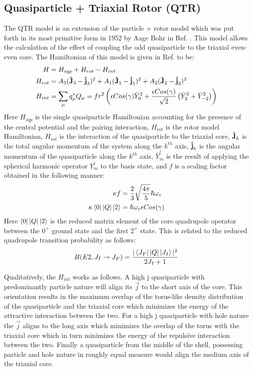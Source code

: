 \subsection{Quasiparticle + Triaxial Rotor (QTR)}
\label{sec:models-qtr}
The QTR model is an extension of the particle + rotor model which was put forth in its most primitive form in 1952 by Aage Bohr in Ref. \cite{bohrParticlePlusRotor}. This model allows the calculation of the effect of coupling the odd quasiparticle to the triaxial even-even core. The Hamiltonian of this model is given in Ref. \cite{frauendorfTransverseWobbling} to be:
\begin{align}
\label{eqn:chp2-qtr-hamil}
H&=H_{sqp}+H_{rot}-H_{int}\\
H_{rot}&=A_3(\boldsymbol{\hat{\textbf{J}}}_3-\boldsymbol{\hat{\textbf{j}}}_3)^2+A_1(\boldsymbol{\hat{\textbf{J}}}_1-\boldsymbol{\hat{\textbf{j}}}_1)^2+A_2(\boldsymbol{\hat{\textbf{J}}}_2-\boldsymbol{\hat{\textbf{j}}}_2)^2\\
H_{int}&= \sum\limits_{\mu}^{}q^*_{\mu}Q_{\mu} = f r^2 \left(\epsilon Cos(\gamma) \bar{Y}^2_0 + \frac{\epsilon Cos(\gamma)}{\sqrt{2}}\left(\bar{Y}^2_2 + \bar{Y}^2_{-2}\right)\right)
\end{align}
Here $H_{sqp}$ is the single quasiparticle Hamiltonian accounting for the presence of the central potential and the pairing interaction, $H_{rot}$ is the rotor model Hamiltonian, $H_{int}$ is the interaction of the quasiparticle to the triaxial core, $\boldsymbol{\hat{\textbf{J}}}_k$ is the total angular momentum of the system along the $k^{th}$ axis, $\boldsymbol{\hat{\textbf{j}}}_k$ is the angular momentum of the quasiparticle along the $k^{th}$ axis, $\bar{Y}^l_m$ is the result of applying the spherical harmonic operator $Y^l_m$ to the basis state, and $f$ is a scaling factor obtained in the following manner:
\begin{align}
\label{eqn:chp2-qtr-int-hamil-scaling}
\kappa f &= \frac{2}{3}\sqrt{\frac{4\pi}{5}}\hbar\omega_{\circ}\\
\kappa \Bra{0}|Q|\Ket{2} & = \hbar\omega_{\circ} \epsilon Cos(\gamma)
\end{align}
Here $\Bra{0}|Q|\Ket{2}$ is the reduced matrix element of the core quadrupole operator between the  $0^+$ ground state and the first $2^+$ state. This is related to the reduced quadrupole transition probability as follows:
\begin{equation}
\label{eqn:chp2-red-mat-el-to-red-trans-prob}
B(E2,J_I\rightarrow{}J_F)=\frac{|\Bra{J_F}|Q|\Ket{J_I}|^2}{2J_I+1}
\end{equation}

Qualitatively, the $H_{int}$ works as follows. A high j quasiparticle with predominantly particle nature will align its $\vec{j}$ to the short axis of the core. This orientation results in the maximum overlap of the torus-like density distribution of the quasiparticle and the triaxial core which minimizes the energy of the attractive interaction between the two. For a high j quasiparticle with hole nature the $\vec{j}$ aligns to the long axis which minimizes the overlap of the torus with the triaxial core which in turn minimizes the energy of the repulsive interaction between the two. Finally a quasiparticle from the middle of the shell, possessing particle and hole nature in roughly equal measure would align the medium axis of the triaxial core.

